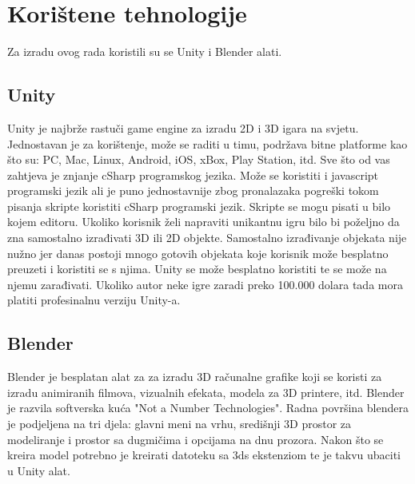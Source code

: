 \section{Korištene tehnologije}

Za izradu ovog rada koristili su se Unity i Blender alati. 
\subsection{Unity}

Unity je najbrže rastuči game engine za izradu 2D i 3D igara na svjetu. Jednostavan je za korištenje, može se raditi u timu, podržava bitne platforme kao što su: PC, Mac, Linux, Android, iOS, xBox, Play Station, itd.
Sve što od vas zahtjeva je znjanje cSharp programskog jezika. Može se koristiti i javascript programski jezik ali je puno jednostavnije zbog pronalazaka pogreški tokom pisanja skripte koristiti cSharp programski jezik. Skripte se mogu pisati u bilo kojem editoru. Ukoliko korisnik želi napraviti unikantnu igru bilo bi poželjno da zna samostalno izrađivati 3D ili 2D objekte. Samostalno izrađivanje objekata nije nužno jer danas postoji mnogo gotovih objekata koje korisnik može besplatno preuzeti i koristiti se s njima. 
Unity se može besplatno koristiti te se može na njemu zarađivati. Ukoliko autor neke igre zaradi preko 100.000 dolara tada mora platiti profesinalnu verziju Unity-a.

 
\subsection{Blender}

Blender je besplatan alat za za izradu 3D računalne grafike koji se koristi za izradu animiranih filmova, vizualnih efekata, modela za 3D printere, itd.
Blender je razvila softverska kuća "Not a Number Technologies". Radna površina blendera je podjeljena na tri djela: glavni meni na vrhu, središnji 3D prostor za modeliranje i prostor sa dugmičima i opcijama na dnu prozora. Nakon što se kreira model potrebno je kreirati datoteku sa 3ds ekstenziom te je takvu ubaciti u Unity alat.